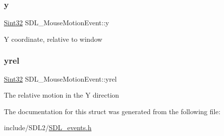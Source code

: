 \subsubsection{\texorpdfstring{y}{y}}
{\footnotesize\ttfamily \hyperlink{_s_d_l__stdinc_8h_a7a90b941db9d4582e9ad7abb9940ff7e}{Sint32} S\+D\+L\+\_\+\+Mouse\+Motion\+Event\+::y}

Y coordinate, relative to window \mbox{\label{struct_s_d_l___mouse_motion_event_a7674c8b92d039ab948f671a180fa7b30}} 
\subsubsection{\texorpdfstring{yrel}{yrel}}
{\footnotesize\ttfamily \hyperlink{_s_d_l__stdinc_8h_a7a90b941db9d4582e9ad7abb9940ff7e}{Sint32} S\+D\+L\+\_\+\+Mouse\+Motion\+Event\+::yrel}

The relative motion in the Y direction 

The documentation for this struct was generated from the following file\+:\begin{DoxyCompactItemize}
\item 
include/\+S\+D\+L2/\hyperlink{_s_d_l__events_8h}{S\+D\+L\+\_\+events.\+h}\end{DoxyCompactItemize}
